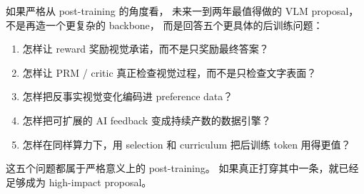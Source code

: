 \documentclass[12pt,a4paper]{article}
\begin{document}
如果严格从 post-training 的角度看，
未来一到两年最值得做的 VLM proposal，
不是再造一个更复杂的 backbone，
而是回答五个更具体的后训练问题：

\begin{enumerate}[leftmargin=2em]
  \item 怎样让 reward 奖励视觉承诺，而不是只奖励最终答案？
  \item 怎样让 PRM / critic 真正检查视觉过程，而不是只检查文字表面？
  \item 怎样把反事实视觉变化编码进 preference data？
  \item 怎样把可扩展的 AI feedback 变成持续产数的数据引擎？
  \item 怎样在同样算力下，用 selection 和 curriculum 把后训练 token 用得更值？
\end{enumerate}

这五个问题都属于严格意义上的 post-training。
如果真正打穿其中一条，就已经足够成为 high-impact proposal。
\end{document}
